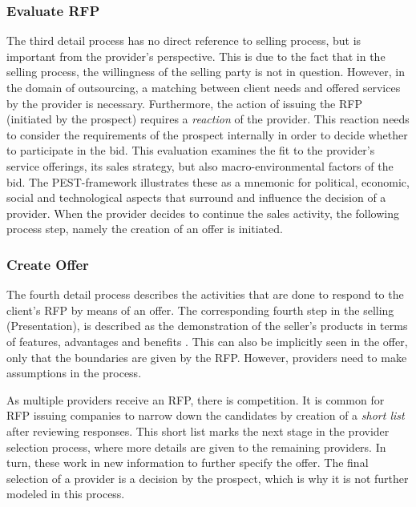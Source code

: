 	\subsubsection{Evaluate \acrshort{RFP}}
	
	The third detail process has no direct reference to selling process, but is important  from the provider's perspective.  This is due to the fact that in the selling process, the willingness of the selling party is not in question. However, in the domain of outsourcing, a matching between client needs and offered services by the provider is necessary. Furthermore, the action of issuing the \acrshort{RFP} (initiated by the prospect) requires a \textit{reaction} of the provider. This reaction needs to consider the requirements of the prospect internally in order to decide whether to participate in the bid. This evaluation examines the fit to the provider's service offerings, its sales strategy, but also macro-environmental factors of the bid. The PEST-framework \citep{0314852336} illustrates these as a mnemonic for political, economic, social and technological aspects that surround and influence the decision of a provider. 
	When the provider decides to continue the sales activity, the following process step, namely the creation of an offer is initiated. 
	
	\subsubsection{Create Offer}
	The fourth detail process describes the activities that are done to respond  to the client's \acrshort{RFP} by means of an offer. The corresponding fourth step in the selling (Presentation), is described as the demonstration of the seller's products in terms of features, advantages and benefits \citep{Moncrief_2005}. This can also be implicitly seen in the offer, only that the boundaries are given by the \acrshort{RFP}. However, providers need to make assumptions in the process. 
	
	As multiple providers receive an \acrshort{RFP}, there is competition. It is common for \acrshort{RFP} issuing companies to narrow down the candidates by creation of a \textit{short list} after reviewing responses. This short list marks the next stage in the provider selection process, where more details are given to the remaining providers. In turn, these work in new information to further specify the offer. The final selection of a provider is a decision by the prospect, which is why it is not further modeled in this process. 
	
